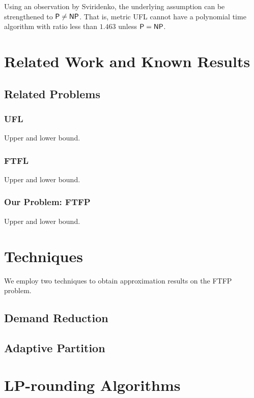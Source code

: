\documentclass[oneside,final]{ucr}
\begin{document}
Using an observation by Sviridenko, the underlying
assumption can be strengthened to ${\mbox{\sf P}} \neq {\mbox{\sf NP}}$. That is,
metric UFL cannot have a polynomial time algorithm with
ratio less than $1.463$ unless ${\mbox{\sf P}} = {\mbox{\sf NP}}$.

\chapter{Related Work and Known Results} \label{ch: related_work}

\section{Related Problems}

\subsection{UFL}
Upper and lower bound.

\subsection{FTFL}
Upper and lower bound.

\subsection{Our Problem: FTFP}
Upper and lower bound.


\chapter{Techniques} \label{ch: techniques}

We employ two techniques to obtain approximation results on the FTFP
problem.

\section{Demand Reduction}

\section{Adaptive Partition}

\chapter{LP-rounding Algorithms} \label{ch: lp-rounding}
\end{document}
